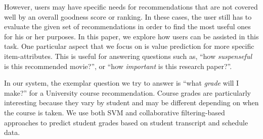 \documentclass{article} %
\begin{document}
However, users may have specific needs for recommendations that are not covered well by an overall goodness score or ranking. In these cases, the user still has to evaluate the given set of recommendations in order to find the most useful ones for his or her purposes. In this paper, we explore how users can be assisted in this task. One particular aspect that we focus on is value prediction for more specific item-attributes. This is useful for answering questions such as, ``how \textit{suspenseful} is this recommended movie?'', or ``how \textit{important} is this research paper?''. 


In our system, the exemplar question we try to answer is ``what \textit{grade} will I make?'' for a University course recommendation. Course grades are particularly interesting because they vary by student and may be different depending on when the course is taken. We use both SVM and collaborative filtering-based approaches to predict student grades based on student transcript and schedule data.





\end{document}
